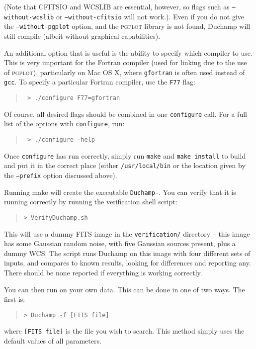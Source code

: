 (Note that CFITSIO and WCSLIB are essential, however, so flags such as
\texttt{--without-wcslib} or \texttt{--without-cfitsio} will not
work.).  Even if you do not give the \texttt{--without-pgplot} option,
and the \textsc{pgplot} library is not found, Duchamp will still
compile (albeit without graphical capabilities).

An additional option that is useful is the ability to specify which
compiler to use. This is very important for the Fortran compiler (used
for linking due to the use of \textsc{pgplot}), particularly on Mac OS
X, where \texttt{gfortran} is often used instead of \texttt{gcc}. To
specify a particular Fortran compiler, use the \texttt{F77} flag:
\begin{quote}
{\footnotesize
\texttt{%
> ./configure F77=gfortran}
}
\end{quote}

Of course, all desired flags should be combined in one
\texttt{configure} call. For a full list of the options with
\texttt{configure}, run:
\begin{quote}
{\footnotesize
\texttt{%
> ./configure --help}
}
\end{quote}
Once \texttt{configure} has run correctly, simply run \texttt{make}
and \texttt{make install} to build \duchamp and put it in the correct
place (either \texttt{/usr/local/bin} or the location given by the
\texttt{--prefix} option discussed above).


Running make will create the executable \texttt{Duchamp-{\version}}. You can
verify that it is running correctly by running the verification shell
script:
\begin{quote}
{\footnotesize
\texttt{> VerifyDuchamp.sh}
}
\end{quote}
This will use a dummy FITS image in the \texttt{verification/}
directory -- this image has some Gaussian random noise, with five
Gaussian sources present, plus a dummy WCS. The script runs
Duchamp on this image with four different sets of inputs, and
compares to known results, looking for differences and reporting
any. There should be none reported if everything is working correctly.

You can then run \duchamp on your own data. This can be done in one
of two ways. The first is:
\begin{quote}
{\footnotesize
\texttt{> Duchamp -f [FITS file]}
}
\end{quote}
where \texttt{[FITS file]} is the file you wish to search. This method
simply uses the default values of all parameters.

